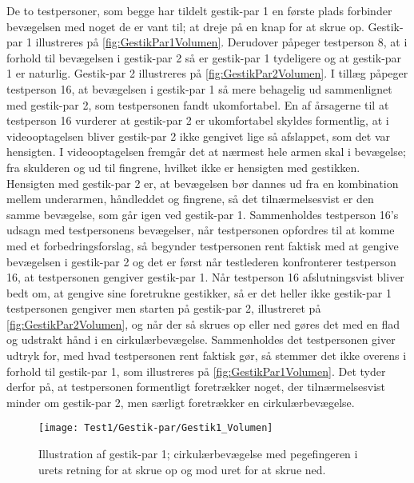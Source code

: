 De to testpersoner, som begge har tildelt gestik-par 1 en første plads forbinder bevægelsen med noget de er vant til; at dreje på en knap for at skrue op. Gestik-par 1 illustreres på \autoref{fig:GestikPar1Volumen}. Derudover påpeger testperson 8, at i forhold til bevægelsen i gestik-par 2 så er gestik-par 1 tydeligere og at gestik-par 1 er naturlig. Gestik-par 2 illustreres på \autoref{fig:GestikPar2Volumen}. I tillæg påpeger testperson 16, at bevægelsen i gestik-par 1 så mere behagelig ud sammenlignet med gestik-par 2, som testpersonen fandt ukomfortabel. En af årsagerne til at testperson 16 vurderer at gestik-par 2 er ukomfortabel skyldes formentlig, at i videooptagelsen bliver gestik-par 2 ikke gengivet lige så afslappet, som det var hensigten. I videooptagelsen fremgår det at nærmest hele armen skal i bevægelse; fra skulderen og ud til fingrene, hvilket ikke er hensigten med gestikken. Hensigten med gestik-par 2 er, at bevægelsen bør dannes ud fra en kombination mellem underarmen, håndleddet og fingrene, så det tilnærmelsesvist er den samme bevægelse, som går igen ved gestik-par 1. Sammenholdes testperson 16’s udsagn med testpersonens bevægelser, når testpersonen opfordres til at komme med et forbedringsforslag, så begynder testpersonen rent faktisk med at gengive bevægelsen i gestik-par 2 og det er først når testlederen konfronterer testperson 16, at testpersonen gengiver gestik-par 1. Når testperson 16 afslutningsvist bliver bedt om, at gengive sine foretrukne gestikker, så er det heller ikke gestik-par 1 testpersonen gengiver men starten på gestik-par 2, illustreret på \autoref{fig:GestikPar2Volumen}, og når der så skrues op eller ned gøres det med en flad og udstrakt hånd i en cirkulærbevægelse. Sammenholdes det testpersonen giver udtryk for, med hvad testpersonen rent faktisk gør, så stemmer det ikke overens i forhold til gestik-par 1, som illustreres på \autoref{fig:GestikPar1Volumen}. Det tyder derfor på, at testpersonen formentligt foretrækker noget, der tilnærmelsesvist minder om gestik-par 2, men særligt foretrækker en cirkulærbevægelse.
%
\begin{figure}[H]
	\centering
	\texttt{[image: Test1/Gestik-par/Gestik1\_Volumen]}
	\caption{Illustration af gestik-par 1; cirkulærbevægelse med pegefingeren i urets retning for at skrue op og mod uret for at skrue ned.}
	\label{fig:GestikPar1Volumen}
\end{figure}
\noindent
%
